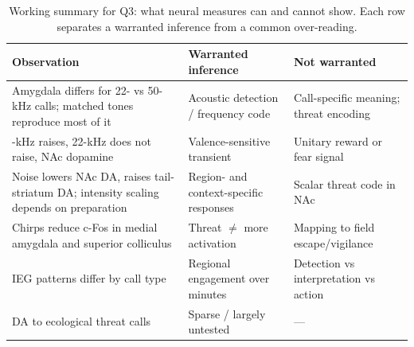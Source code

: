 \begin{table}[tbp]
\centering
\footnotesize
\singlespacing
\caption{Working summary for Q3: what neural measures can and cannot show. Each row separates a warranted inference from a common over-reading.}
\label{tab:summary-q3}
\begin{tabular}{@{}p{1.45in}p{2.4in}p{2.4in}@{}}
\toprule
\textbf{Observation} & \textbf{Warranted inference} & \textbf{Not warranted} \\
\midrule
Amygdala differs for 22- vs 50-kHz calls; matched tones reproduce most of it & Acoustic detection / frequency code & Call-specific meaning; threat encoding \\
\addlinespace[2pt]
50-kHz raises, 22-kHz does not raise, NAc dopamine & Valence-sensitive transient & Unitary reward or fear signal \\
\addlinespace[2pt]
Noise lowers NAc DA, raises tail-striatum DA; intensity scaling depends on preparation & Region- and context-specific responses & Scalar threat code in NAc \\
\addlinespace[2pt]
Chirps reduce c-Fos in medial amygdala and superior colliculus & Threat $\neq$ more activation & Mapping to field escape/vigilance \\
\addlinespace[2pt]
IEG patterns differ by call type & Regional engagement over minutes & Detection vs interpretation vs action \\
\addlinespace[2pt]
DA to ecological threat calls & Sparse / largely untested & --- \\
\bottomrule
\end{tabular}
\end{table}
